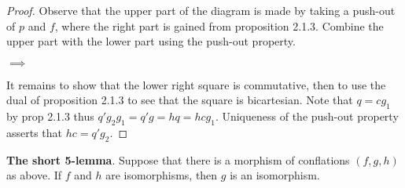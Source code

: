     \begin{proof}
        Observe that the upper part of the diagram is made by taking a push-out of $p$ and $f$, where the right part is gained from proposition 2.1.3. Combine the upper part with the lower part using the push-out property.
        \begin{center}
             $\implies$
        \end{center}
        It remains to show that the lower right square is commutative, then to use the dual of proposition 2.1.3 to see that the square is bicartesian. Note that $q=cg_1$ by prop 2.1.3 thus $q'g_2g_1=q'g=hq=hcg_1$. Uniqueness of the push-out property asserts that $hc=q'g_2$.
    \end{proof}

    \begin{corollary}
        \textbf{The short 5-lemma}. Suppose that there is a morphism of conflations $(f,g,h)$ as above. If $f$ and $h$ are isomorphisms, then $g$ is an isomorphism.
    \end{corollary}

